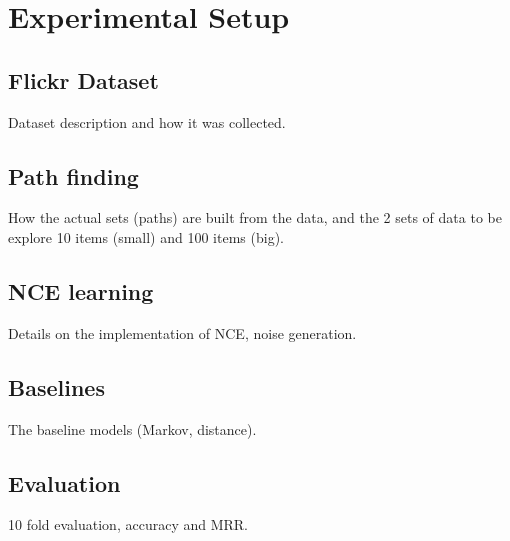 \chapter{Experimental Setup}
\label{sec:experimental_setup}

\section{Flickr Dataset}

Dataset description and how it was collected.

\section{Path finding}

How the actual sets (paths) are built from the data, and the 2 sets of data to be explore 10 items (small) and 100 items (big).

\section{NCE learning}

Details on the implementation of NCE, noise generation.

\section{Baselines}

The baseline models (Markov, distance).

\section{Evaluation}

10 fold evaluation, accuracy and MRR.
